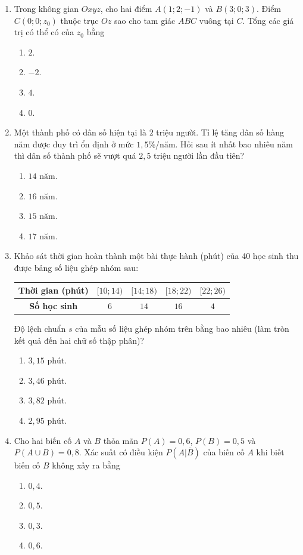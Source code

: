 \documentclass[12pt,a4paper]{article}
\begin{document}
\begin{enumerate}[label=\textbf{Câu \arabic*:}, leftmargin=*]
\item Trong không gian $Oxyz$, cho hai điểm $A(1; 2; -1)$ và $B(3; 0; 3)$. Điểm $C(0; 0; z_0)$ thuộc trục $Oz$ sao cho tam giác $ABC$ vuông tại $C$. Tổng các giá trị có thể có của $z_0$ bằng
\begin{enumerate}[label=\Alph*.]
    \item $2$.
    \item $-2$.
    \item $4$.
    \item $0$.
\end{enumerate}

\item Một thành phố có dân số hiện tại là $2$ triệu người. Tỉ lệ tăng dân số hàng năm được duy trì ổn định ở mức $1{,}5\%$/năm. Hỏi sau ít nhất bao nhiêu năm thì dân số thành phố sẽ vượt quá $2{,}5$ triệu người lần đầu tiên?
\begin{enumerate}[label=\Alph*.]
    \item $14\text{ năm}$.
    \item $16\text{ năm}$.
    \item $15\text{ năm}$.
    \item $17\text{ năm}$.
\end{enumerate}

\item Khảo sát thời gian hoàn thành một bài thực hành (phút) của 40 học sinh thu được bảng số liệu ghép nhóm sau:
\begin{center}
\begin{tabular}{|c|c|c|c|c|}
\hline
\textbf{Thời gian (phút)} & $[10; 14)$ & $[14; 18)$ & $[18; 22)$ & $[22; 26)$ \\ \hline
\textbf{Số học sinh} & $6$ & $14$ & $16$ & $4$ \\ \hline
\end{tabular}
\end{center}
Độ lệch chuẩn $s$ của mẫu số liệu ghép nhóm trên bằng bao nhiêu (làm tròn kết quả đến hai chữ số thập phân)?
\begin{enumerate}[label=\Alph*.]
    \item $3{,}15\text{ phút}$.
    \item $3{,}46\text{ phút}$.
    \item $3{,}82\text{ phút}$.
    \item $2{,}95\text{ phút}$.
\end{enumerate}

\item Cho hai biến cố $A$ và $B$ thỏa mãn $P(A) = 0{,}6$, $P(B) = 0{,}5$ và $P(A \cup B) = 0{,}8$. Xác suất có điều kiện $P(A|\overline{B})$ của biến cố $A$ khi biết biến cố $B$ không xảy ra bằng
\begin{enumerate}[label=\Alph*.]
    \item $0{,}4$.
    \item $0{,}5$.
    \item $0{,}3$.
    \item $0{,}6$.
\end{enumerate}


\end{enumerate}
\end{document}
